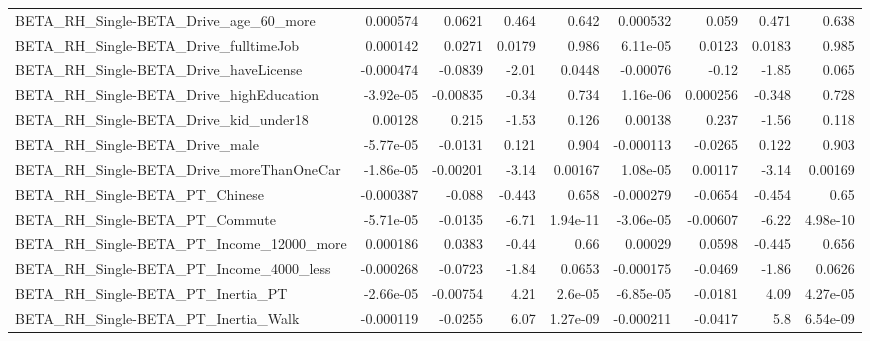 \begin{tabular}{lrrrrrrrr}
BETA\_RH\_Single-BETA\_Drive\_age\_60\_more              &    0.000574 &       0.0621 &    0.464 &    0.642 &   0.000532 &       0.059 &        0.471 &         0.638 \\
BETA\_RH\_Single-BETA\_Drive\_fulltimeJob              &    0.000142 &       0.0271 &   0.0179 &    0.986 &   6.11e-05 &      0.0123 &       0.0183 &         0.985 \\
BETA\_RH\_Single-BETA\_Drive\_haveLicense              &   -0.000474 &      -0.0839 &    -2.01 &   0.0448 &   -0.00076 &       -0.12 &        -1.85 &         0.065 \\
BETA\_RH\_Single-BETA\_Drive\_highEducation            &   -3.92e-05 &     -0.00835 &    -0.34 &    0.734 &   1.16e-06 &    0.000256 &       -0.348 &         0.728 \\
BETA\_RH\_Single-BETA\_Drive\_kid\_under18              &     0.00128 &        0.215 &    -1.53 &    0.126 &    0.00138 &       0.237 &        -1.56 &         0.118 \\
BETA\_RH\_Single-BETA\_Drive\_male                     &   -5.77e-05 &      -0.0131 &    0.121 &    0.904 &  -0.000113 &     -0.0265 &        0.122 &         0.903 \\
BETA\_RH\_Single-BETA\_Drive\_moreThanOneCar           &   -1.86e-05 &     -0.00201 &    -3.14 &  0.00167 &   1.08e-05 &     0.00117 &        -3.14 &       0.00169 \\
BETA\_RH\_Single-BETA\_PT\_Chinese                     &   -0.000387 &       -0.088 &   -0.443 &    0.658 &  -0.000279 &     -0.0654 &       -0.454 &          0.65 \\
BETA\_RH\_Single-BETA\_PT\_Commute                     &   -5.71e-05 &      -0.0135 &    -6.71 & 1.94e-11 &  -3.06e-05 &    -0.00607 &        -6.22 &      4.98e-10 \\
BETA\_RH\_Single-BETA\_PT\_Income\_12000\_more           &    0.000186 &       0.0383 &    -0.44 &     0.66 &    0.00029 &      0.0598 &       -0.445 &         0.656 \\
BETA\_RH\_Single-BETA\_PT\_Income\_4000\_less            &   -0.000268 &      -0.0723 &    -1.84 &   0.0653 &  -0.000175 &     -0.0469 &        -1.86 &        0.0626 \\
BETA\_RH\_Single-BETA\_PT\_Inertia\_PT                  &   -2.66e-05 &     -0.00754 &     4.21 &  2.6e-05 &  -6.85e-05 &     -0.0181 &         4.09 &      4.27e-05 \\
BETA\_RH\_Single-BETA\_PT\_Inertia\_Walk                &   -0.000119 &      -0.0255 &     6.07 & 1.27e-09 &  -0.000211 &     -0.0417 &          5.8 &      6.54e-09 \\

\end{tabular}
